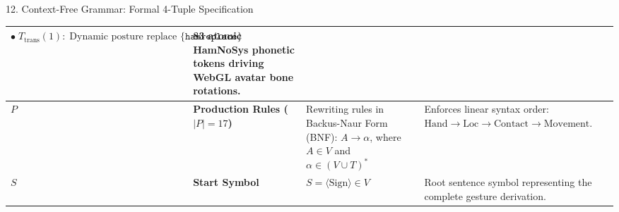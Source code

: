 \documentclass[aspectratio=169]{beamer}
\begin{document}
\begin{frame}[t]{12. Context-Free Grammar: Formal 4-Tuple Specification}
{\begin{tabular}{|>{\centering\arraybackslash\bfseries}p{0.8cm}|>{\raggedright\arraybackslash\bfseries}p{2.3cm}|>{\raggedright\arraybackslash}p{6.4cm}|>{\raggedright\arraybackslash}p{3.0cm}|}
    $\bullet\; T_{\text{trans}} (1):\; \text{Dynamic posture replace } \{\texttt{hamreplace}\}$ & 
    83 atomic HamNoSys phonetic tokens driving WebGL avatar bone rotations. \\
    \hline
    \rowcolor{lightyellow} 
    $P$ & Production Rules ($|P|=17$) & 
    Rewriting rules in Backus-Naur Form (BNF): $A \to \alpha$, where $A \in V$ and $\alpha \in (V \cup T)^*$ & 
    Enforces linear syntax order: $\text{Hand} \to \text{Loc} \to \text{Contact} \to \text{Movement}$. \\
    \hline
    \rowcolor{lightorange} 
    $S$ & Start Symbol & 
    $S = \langle\text{Sign}\rangle \in V$ & 
    Root sentence symbol representing the complete gesture derivation. \\
    \hline
\end{tabular}
}

\vspace{1.2mm}
\end{frame}
\end{document}
